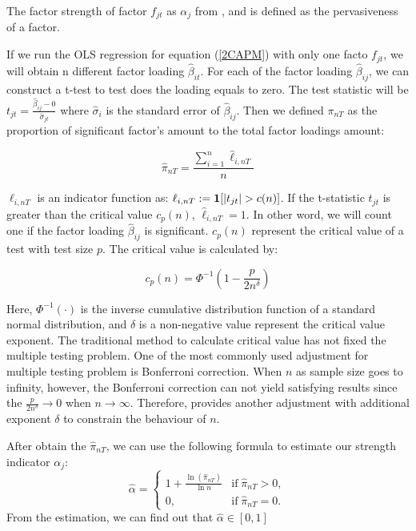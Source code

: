 \documentclass[12pt]{article}
\begin{document}
The factor strength of factor $f_{jt}$ as $\alpha_j$ from , and  is defined as the pervasiveness of a factor.

If we run the OLS regression for equation (\ref{2CAPM}) with only one facto  $f_{jt}$, we will obtain n different factor loading $\hat{\beta}_{it}$. For each of the  factor loading $\hat{\beta}_{ij}$, we can construct a t-test to test does the loading equals to zero. The test statistic will be $t_{jt} = \frac{\hat{\beta}_{ij} - 0}{\hat{\sigma}_{jt}}$ where $\hat{\sigma}_{i}$ is the standard error of $\hat{\beta}_{ij}$.  
Then we defined $\pi_{nT}$ as the proportion of significant factor's amount to the total factor loadings amount:

\[  \hat{\pi}_{nT} = \frac{\sum_{i=1}^n \hat{\ell}_{i,nT}}{n} \tag{2} \label{pi_function} \]

$\ell_{i,nT}$ is an indicator function as: $\ell_{i,nT} := {\bf1}[|t_{jt}|>c(n)]$. 
If the t-statistic $t_{jt}$ is greater than the critical value $c_p(n)$,  $\hat{\ell}_{i,nT} = 1$. 
In other word, we will count one if the factor loading $\hat{\beta}_{ij}$ is significant. 
$c_p(n)$ represent the critical value of a test with test size $p$. 
The critical value is calculated by:

\[   c_p(n) = \Phi^{-1}(1 - \frac{p}{2n^\delta})   \tag{3} \label{critical_value_function} \]

Here, $\Phi^{-1}(\cdot)$ is the inverse cumulative distribution function of a standard normal distribution, and $\delta$ is a non-negative value represent the critical value exponent. 
The traditional method to calculate critical value has not fixed the multiple testing problem. 
One of the most commonly used adjustment for multiple testing problem is Bonferroni correction. 
When $n$ as sample size goes to infinity, however, the Bonferroni correction can not yield satisfying results since the $\frac{p}{2n^{\delta}} \to 0$ when $n \to \infty$. 
Therefore,  provides another adjustment with additional exponent $\delta$ to constrain the behaviour of $n$.

After obtain the $\hat{\pi}_{nT}$, we can use the following formula to estimate our strength indicator $\alpha_j$:
\[ \hat{\alpha} = \begin{cases}
1+\frac{\ln(\hat{\pi}_{nT})}{\ln n} & \text{if}\; \hat{\pi}_{nT} > 0,\\
0, & \text{if}\; \hat{\pi}_{nT} = 0.
\end{cases} \]
From the estimation, we can find out that $\hat{\alpha} \in [0,1]$
\end{document}
